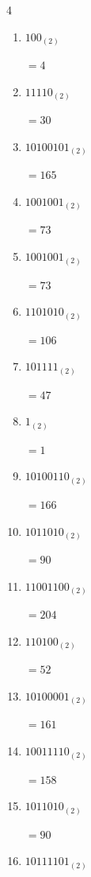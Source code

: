 \begin{multicols}{4}
\begin{enumerate}
        $=115$

  \item $100_{(2)}$

        $=4$

  \item $11110_{(2)}$

        $=30$

  \item $10100101_{(2)}$

        $=165$

  \item $1001001_{(2)}$

        $=73$

  \item $1001001_{(2)}$

        $=73$

\columnbreak %

\resetques

  \item $1101010_{(2)}$

        $=106$

  \item $101111_{(2)}$

        $=47$

  \item $1_{(2)}$

        $=1$

  \item $10100110_{(2)}$

        $=166$

  \item $1011010_{(2)}$

        $=90$

  \item $11001100_{(2)}$

        $=204$

  \item $110100_{(2)}$

        $=52$

  \item $10100001_{(2)}$

        $=161$

  \item $10011110_{(2)}$

        $=158$

  \item $1011010_{(2)}$

        $=90$

  \item $10111101_{(2)}$


\end{enumerate}
\end{multicols}
